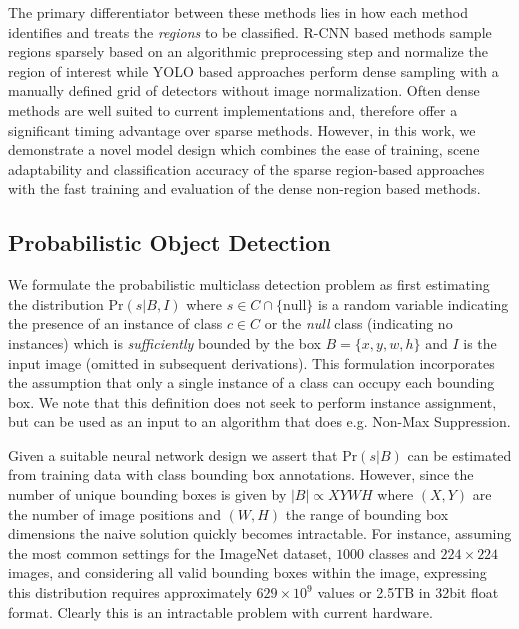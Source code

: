 \documentclass[10pt,twocolumn]{article}
\begin{document}
The primary differentiator between these methods lies in how each method identifies and treats the \textit{regions} to be classified. R-CNN based methods sample regions sparsely based on an algorithmic preprocessing step and normalize the region of interest while YOLO based approaches perform dense sampling with a manually defined grid of detectors without image normalization. Often dense methods are well suited to current implementations and, therefore offer a significant timing advantage over sparse methods. However, in this work, we demonstrate a novel model design which combines the ease of training, scene adaptability and classification accuracy of the sparse region-based approaches with the fast training and evaluation of the dense non-region based methods. 


\subsection{Probabilistic Object Detection}

We formulate the probabilistic multiclass detection problem as first estimating the distribution $\mathrm{Pr}(s | B, I)$ where $s \in C \cap \lbrace \mathrm{null} \rbrace$ is a 
random variable indicating the presence of an instance of class $c \in C$ or the \textit{null} class (indicating no instances) which is \textit{sufficiently} bounded by the box $B = \lbrace x, y, w, h \rbrace$ and $I$ is the input image (omitted in subsequent derivations).
This formulation incorporates the assumption that only a single instance of a class can occupy each bounding box.
We note that this definition does not seek to perform instance assignment, but can be used as an input to an algorithm that does e.g. Non-Max Suppression.

Given a suitable neural network design we assert that $\mathrm{Pr}(s | B)$ can be estimated from training data with class bounding box annotations. However, since the number of unique bounding boxes is given by $|B| \propto XYWH$ where $(X,Y)$ are the number of image positions and $(W,H)$ the range of bounding box dimensions the naive solution quickly becomes intractable. For instance, assuming the most common settings for the ImageNet dataset, $1000$ classes and $224\times 224$ images, and considering all valid bounding boxes within the image, expressing this distribution requires approximately $629 \times 10^{9}$ values or 2.5TB in 32bit float format. Clearly this is an intractable problem with current hardware. 
\end{document}
